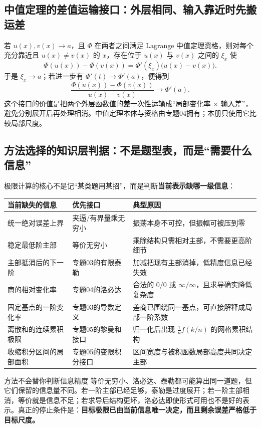 \documentclass[11pt,a4paper]{ctexart}
\newcommand{\kw}[1]{\textbf{\color{deep}#1}}
\begin{document}
\subsection{中值定理的差值运输接口：外层相同、输入靠近时先搬运差}

若 $u(x),v(x)\to a$，且 $\Phi$ 在两者之间满足 Lagrange 中值定理资格，则对每个充分靠近且 $u(x)\ne v(x)$ 的 $x$，存在位于 $u(x)$ 与 $v(x)$ 之间的 $\xi_x$ 使
\[
\Phi(u(x))-\Phi(v(x))=\Phi'(\xi_x)\bigl(u(x)-v(x)\bigr).
\]
于是 $\xi_x\to a$；若进一步有 $\Phi'(t)\to\Phi'(a)$，便得到
\[
\frac{\Phi(u(x))-\Phi(v(x))}{u(x)-v(x)}\to\Phi'(a).
\]
这个接口的价值是把两个外层函数值的\kw{差}一次性运输成“局部变化率 $\times$ 输入差”，避免分别展开后再处理相消。中值定理本体与资格由专题04拥有；本册只使用它比较局部尺度。

\subsection{方法选择的知识层判据：不是题型表，而是“需要什么信息”}

极限计算的核心不是记“某类题用某招”，而是判断\textbf{当前表示缺哪一级信息}：

\begin{tabularx}{\linewidth}{L{3.0cm}L{3.0cm}Y}
\toprule
\textbf{当前缺失的信息} & \textbf{优先接口} & \textbf{典型原因}\\
\midrule
统一绝对误差上界 & 夹逼/有界量乘无穷小 & 振荡本身不可控，但振幅可被压到零\\
稳定最低阶主部 & 等价无穷小 & 乘除结构只需相对主部，不需要更高阶细节\\
主部抵消后的下一阶 & 专题03的有限泰勒 & 加减把现有主部消掉，低精度信息已经失效\\
商的相对变化率 & 专题04的洛必达 & 合法的 $0/0$ 或 $\infty/\infty$，且求导确实降低复杂度\\
固定基点的一阶变化率 & 专题03的导数定义 & 差商已围绕同一基点，可直接解释成局部一阶系数\\
离散和的连续累积极限 & 专题05的黎曼和接口 & 归一化后出现 $\frac1n f(k/n)$ 的网格累积结构\\
收缩积分区间的局部面积 & 专题05的变限积分接口 & 区间宽度与被积函数局部高度共同决定主部\\
\bottomrule
\end{tabularx}

\begin{corebox}{方法不会替你判断信息精度}
等价无穷小、洛必达、泰勒都可能算出同一道题，但它们保留的信息量不同。若一阶主部已经足够，泰勒是过度展开；若一阶主部相消，等价就是信息不足；若求导后结构更坏，洛必达即使形式可用也不是好的表示。真正的停止条件是：\textbf{目标极限已由当前信息唯一决定，而且剩余误差严格低于目标尺度。}
\end{corebox}
\end{document}
